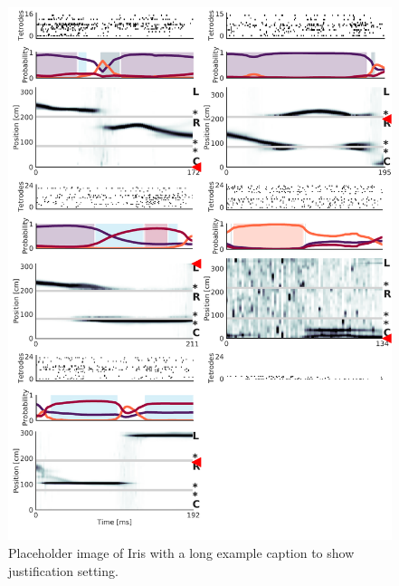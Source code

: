 \documentclass[times, twoside]{zHenriquesLab-StyleBioRxiv}
\begin{document}
\begin{figure}%
\centering
\includegraphics[width=0.80\linewidth]{figures/Figure3-supplemental1/Figure3_v2_supplemental1}
\caption{Placeholder image of Iris with a long example caption to show justification setting.}
\label{fig:Figure3-Figure supplement 1}
\end{figure}


\end{document}
